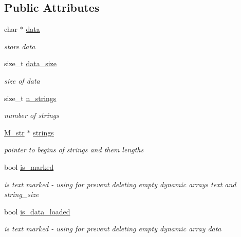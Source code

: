 \subsection*{Public Attributes}
\begin{DoxyCompactItemize}
\item 
\mbox{\label{class_string_array_a1b86e87f389149e5143a2d6e4cc5a464}} 
char $\ast$ \mbox{\hyperlink{class_string_array_a1b86e87f389149e5143a2d6e4cc5a464}{data}}
\begin{DoxyCompactList}\small\item\em store data \end{DoxyCompactList}\item 
\mbox{\label{class_string_array_a78df6a7a88bb76cefed3cd469aa09788}} 
size\+\_\+t \mbox{\hyperlink{class_string_array_a78df6a7a88bb76cefed3cd469aa09788}{data\+\_\+size}}
\begin{DoxyCompactList}\small\item\em size of data \end{DoxyCompactList}\item 
\mbox{\label{class_string_array_a96296abcd8e01d01f73efe92b4aef425}} 
size\+\_\+t \mbox{\hyperlink{class_string_array_a96296abcd8e01d01f73efe92b4aef425}{n\+\_\+strings}}
\begin{DoxyCompactList}\small\item\em number of strings \end{DoxyCompactList}\item 
\mbox{\label{class_string_array_a5dae54570e013eab403ee262d780e642}} 
\mbox{\hyperlink{struct_m__str}{M\+\_\+str}} $\ast$ \mbox{\hyperlink{class_string_array_a5dae54570e013eab403ee262d780e642}{strings}}
\begin{DoxyCompactList}\small\item\em pointer to begins of strings and them lengths \end{DoxyCompactList}\item 
\mbox{\label{class_string_array_a438db887b1aedf7854164e8522da6fad}} 
bool \mbox{\hyperlink{class_string_array_a438db887b1aedf7854164e8522da6fad}{is\+\_\+marked}}
\begin{DoxyCompactList}\small\item\em is text marked -\/ using for prevent deleting empty dynamic arrays text and string\+\_\+size \end{DoxyCompactList}\item 
\mbox{\label{class_string_array_a332dc35eec0e0e0ee243eed963a48cb3}} 
bool \mbox{\hyperlink{class_string_array_a332dc35eec0e0e0ee243eed963a48cb3}{is\+\_\+data\+\_\+loaded}}
\begin{DoxyCompactList}\small\item\em is text marked -\/ using for prevent deleting empty dynamic array data \end{DoxyCompactList}\end{DoxyCompactItemize}
